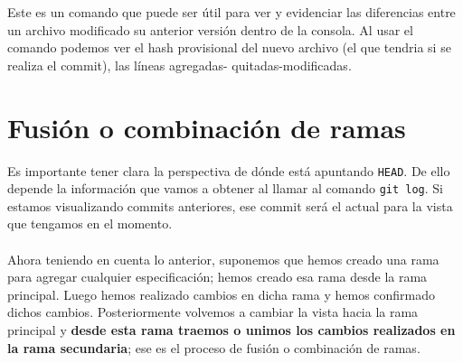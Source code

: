 Este es un comando que puede ser útil para ver y evidenciar las diferencias entre un archivo modificado su anterior versión dentro de la consola. Al usar el comando podemos ver el hash provisional del nuevo archivo (el que tendria si se realiza el commit), las líneas agregadas- quitadas-modificadas.

\section{Fusión o combinación de ramas}
Es importante tener clara la perspectiva de dónde está apuntando \texttt{HEAD}. De ello depende la información que vamos a obtener al llamar al comando \texttt{git log}. Si estamos visualizando commits anteriores, ese commit será el actual para la vista que tengamos en el momento. \\\\
Ahora teniendo en cuenta lo anterior, suponemos que hemos creado una rama para agregar cualquier especificación; hemos creado esa rama desde la rama principal. Luego hemos realizado cambios en dicha rama y hemos confirmado dichos cambios. Posteriormente volvemos a cambiar la vista hacia la rama principal y \textbf{desde esta rama traemos o unimos los cambios realizados en la rama secundaria}; ese es el proceso de fusión o combinación de ramas. 

